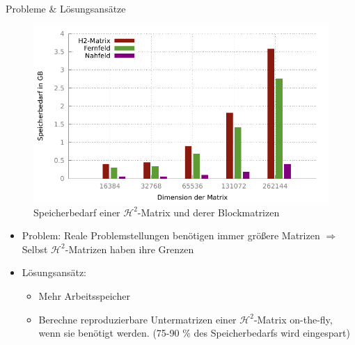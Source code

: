 \documentclass[10pt]{beamer}
\begin{document}
\begin{frame}{Probleme \& Lösungsansätze}
  \begin{figure}
    \centering
    \includegraphics[width=.45\linewidth]{figures/fg-memory-h2-nf-ff.pdf}
    \caption{Speicherbedarf einer \(\mathcal{H}^2\)-Matrix und derer 
             Blockmatrizen}
  \end{figure}
  \begin{itemize}
    \item Problem: Reale Problemstellungen benötigen immer größere Matrizen
          \(\Rightarrow\) Selbst \(\mathcal{H}^2\)-Matrizen haben ihre Grenzen
    \item Lösungsansätz:
    \begin{itemize}
      \item Mehr Arbeitsspeicher
      \item Berechne reproduzierbare Untermatrizen einer
            \(\mathcal{H}^2\)-Matrix on-the-fly, wenn sie benötigt werden.
            (75-90 \% des Speicherbedarfs wird eingespart)
    \end{itemize}
  \end{itemize}
\end{frame}
\end{document}
